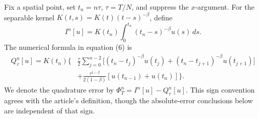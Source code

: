 \documentclass[11pt]{amsart}
\numberwithin{equation}{section}
\theoremstyle{remark}
\begin{document}
Fix a spatial point, set $t_n=n\tau$, $\tau=T/N$, and suppress the
$x$-argument. For the separable kernel
$K(t,s)=K(t)(t-s)^{-\beta}$, define
\begin{equation}\label{eq:vq-integral}
I^n[u]=K(t_n)\int_0^{t_n}(t_n-s)^{-\beta}u(s)\,ds.
\end{equation}
The numerical formula in equation (6) is
\begin{equation}\label{eq:vq-rule}
\begin{split}
Q_\tau^n[u]=K(t_n)\biggl\{
&\frac\tau2\sum_{j=0}^{n-2}
\bigl[(t_n-t_j)^{-\beta}u(t_j)+(t_n-t_{j+1})^{-\beta}u(t_{j+1})\bigr]\\
&+\frac{\tau^{1-\beta}}{2(1-\beta)}[u(t_{n-1})+u(t_n)]\biggr\}.
\end{split}
\end{equation}
We denote the quadrature error by $\Phi_T^n=I^n[u]-Q_\tau^n[u]$. This sign
convention agrees with the article's definition, though the absolute-error
conclusions below are independent of that sign.
\end{document}

